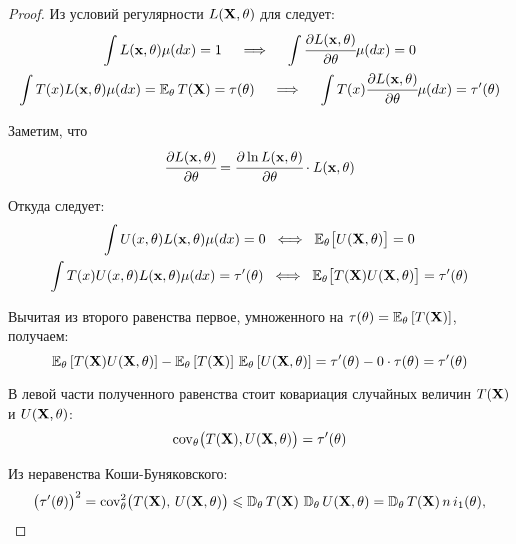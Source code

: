 \begin{proof}
    Из условий регулярности $L(\mathbf{X}, \theta)$ для следует:
    \begin{gather*}
        \int L(\mathbf{x}, \theta) \mu(d x)=1 
        \quad \implies \quad
        \int \cfrac{\partial L(\mathbf{x}, \theta)}{\partial \theta} \mu(d x)=0 \\
        \int T(x) L(\mathbf{x}, \theta) \mu(d x)=\operatorname{\operatorname{\mathbb{E}}_{\theta}} T(\mathbf{X})=\tau(\theta) 
        \quad \implies \quad
        \int T(x) \cfrac{\partial L(\mathbf{x}, \theta)}{\partial \theta} \mu(d x)=\tau'(\theta)
    \end{gather*}

    Заметим, что
    \begin{equation*}
        \cfrac{\partial L(\mathbf{x}, \theta)}{\partial \theta}=\cfrac{\partial \ln L(\mathbf{x}, \theta)}{\partial \theta} \cdot L(\mathbf{x}, \theta)
    \end{equation*}

    Откуда следует:
    \begin{gather*}
        \int U(x, \theta) L(\mathbf{x}, \theta) \mu(d x) = 0 \; \iff \; \operatorname{\operatorname{\mathbb{E}}_{\theta}} \bigl[U(\mathbf{X}, \theta)\bigr]=0 \\
        \int T(x) U(x, \theta) L(\mathbf{x}, \theta) \mu(d x) = \tau'(\theta) \; \iff \; \operatorname{\operatorname{\mathbb{E}}_{\theta}} \bigl[ T(\mathbf{X}) U(\mathbf{X}, \theta) \bigr] = \tau'(\theta)
    \end{gather*}

    Вычитая из второго равенства первое, умноженного на $\tau(\theta) = \operatorname{\operatorname{\mathbb{E}}_{\theta}} \left[ T(\mathbf{X}) \right]$, получаем:
    \begin{equation*}
        \operatorname{\operatorname{\mathbb{E}}_{\theta}}\left[T(\mathbf{X}) U(\mathbf{X}, \theta)\right] - \operatorname{\operatorname{\mathbb{E}}_{\theta}}\left[T(\mathbf{X})\right] \, \operatorname{\operatorname{\mathbb{E}}_{\theta}}\left[U(\mathbf{X}, \theta)\right] = 
        \tau'(\theta) - 0 \cdot \tau(\theta) = 
        \tau'(\theta)
    \end{equation*}

    В левой части полученного равенства стоит ковариация случайных величин $T(\mathbf{X})$ и $U(\mathbf{X},\theta)$:
    \begin{equation*}
        \operatorname{cov}_{\theta}\bigl(T(\mathbf{X}), U(\mathbf{X}, \theta)\bigr)=\tau'(\theta)
    \end{equation*}

    Из неравенства Коши-Буняковского:
    \begin{equation*}
        \bigl(\tau'(\theta)\bigr)^{2}=\operatorname{cov}_{\theta}^{2} \bigl(T(\mathbf{X}), \, U(\mathbf{X}, \theta)\bigr) \leqslant 
        \operatorname{\mathbb{D}_{\theta}} T(\mathbf{X}) \,\operatorname{\mathbb{D}_{\theta}} U(\mathbf{X}, \theta) = 
        \operatorname{\mathbb{D}_{\theta}} T(\mathbf{X}) \, n \, i_1(\theta),
    \end{equation*}


\end{proof}

